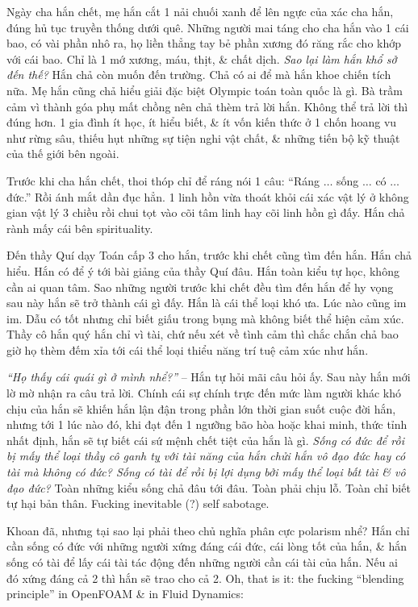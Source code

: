 \documentclass[12pt]{article}
\begin{document}
Ngày cha hắn chết, mẹ hắn cắt 1 nải chuối xanh để lên ngực của xác cha hắn, đúng hủ tục truyền thống dưới quê. Những người mai táng cho cha hắn vào 1 cái bao, có vài phần nhô ra, họ liền thẳng tay bẻ phần xương đó răng rắc cho khớp với cái bao. Chỉ là 1 mớ xương, máu, thịt, \& chất dịch. {\it Sao lại làm hắn khổ sở đến thế?} Hắn chả còn muốn đến trường. Chả có ai để mà hắn khoe chiến tích nữa. Mẹ hắn cũng chả hiểu giải đặc biệt Olympic toán toàn quốc là gì. Bà trầm cảm vì thành góa phụ mất chồng nên chả thèm trả lời hắn. Không thể trả lời thì đúng hơn. 1 gia đình ít học, ít hiểu biết, \& ít vốn kiến thức ở 1 chốn hoang vu như rừng sâu, thiếu hụt những sự tiện nghi vật chất, \& những tiến bộ kỹ thuật của thế giới bên ngoài.

Trước khi cha hắn chết, thoi thóp chỉ để ráng nói 1 câu: ``Ráng $\ldots$ sống $\ldots$ có $\ldots$ đức.'' Rồi ánh mắt dần đục hẳn. 1 linh hồn vừa thoát khỏi cái xác vật lý ở không gian vật lý 3 chiều rồi chui tọt vào cõi tâm linh hay cõi linh hồn gì đấy. Hắn chả rành mấy cái bên spirituality.

Đến thầy Quí dạy Toán cấp 3 cho hắn, trước khi chết cũng tìm đến hắn. Hắn chả hiểu. Hắn có để ý tới bài giảng của thầy Quí đâu. Hắn toàn kiểu tự học, không cần ai quan tâm. Sao những người trước khi chết đều tìm đến hắn để hy vọng sau này hắn sẽ trở thành cái gì đấy. Hắn là cái thể loại khó ưa. Lúc nào cũng im im. Dẫu có tốt nhưng chỉ biết giấu trong bụng mà không biết thể hiện cảm xúc. Thầy cô hắn quý hắn chỉ vì tài, chứ nếu xét về tình cảm thì chắc chắn chả bao giờ họ thèm đếm xỉa tới cái thể loại thiểu năng trí tuệ cảm xúc như hắn.

{\it``Họ thấy cái quái gì ở mình nhể?''} -- Hắn tự hỏi mãi câu hỏi ấy. Sau này hắn mới lờ mờ nhận ra câu trả lời. Chính cái sự chính trực đến mức làm người khác khó chịu của hắn sẽ khiến hắn lận đận trong phần lớn thời gian suốt cuộc đời hắn, nhưng tới 1 lúc nào đó, khi đạt đến 1 ngưỡng bão hòa hoặc khai minh, thức tỉnh nhất định, hắn sẽ tự biết cái sứ mệnh chết tiệt của hắn là gì. {\it Sống có đức để rồi bị mấy thể loại thầy cô ganh tỵ với tài năng của hắn chửi hắn vô đạo đức hay có tài mà không có đức? Sống có tài để rồi bị lợi dụng bởi mấy thể loại bất tài \& vô đạo đức?} Toàn những kiểu sống chả đâu tới đâu. Toàn phải chịu lỗ. Toàn chỉ biết tự hại bản thân. Fucking inevitable (?) self sabotage.

Khoan đã, nhưng tại sao lại phải theo chủ nghĩa phân cực polarism nhể? Hắn chỉ cần sống có đức với những người xứng đáng cái đức, cái lòng tốt của hắn, \& hắn sống có tài để lấy cái tài tác động đến những người cần cái tài của hắn. Nếu ai đó xứng đáng cả 2 thì hắn sẽ trao cho cả 2. Oh, that is it: the fucking ``blending principle'' in OpenFOAM \& in Fluid Dynamics:
\end{document}
